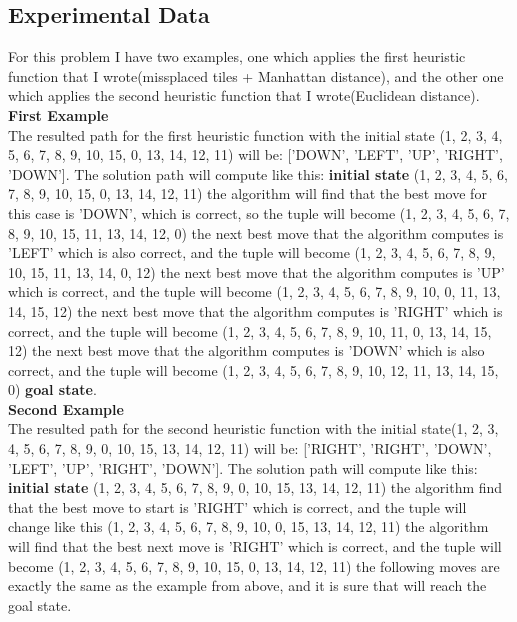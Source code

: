 \documentclass[14pt]{article}
\begin{document}
\subsection{Experimental Data}
For this problem I have two examples, one which applies the first heuristic function that I wrote(missplaced tiles + Manhattan distance), and the other one which applies the second heuristic function that I wrote(Euclidean distance).
\vspace{2.5 mm}
\\\textbf{First Example}
\vspace{2.5 mm}
\\The resulted path for the first heuristic function with the initial state (1, 2, 3, 4, 5, 6, 7, 8, 9, 10, 15, 0, 13, 14, 12, 11) will be: ['DOWN', 'LEFT', 'UP', 'RIGHT', 'DOWN']. The solution path will compute like this: \textbf{initial state} \textrightarrow (1, 2, 3, 4, 5, 6, 7, 8, 9, 10, 15, 0, 13, 14, 12, 11) \textrightarrow the algorithm will find that the best move for this case is 'DOWN', which is correct, so the tuple will become (1, 2, 3, 4, 5, 6, 7, 8, 9, 10, 15, 11, 13, 14, 12, 0) \textrightarrow the next best move that the algorithm computes is 'LEFT' which is also correct, and the tuple will become (1, 2, 3, 4, 5, 6, 7, 8, 9, 10, 15, 11, 13, 14, 0, 12) \textrightarrow the next best move that the algorithm computes is 'UP' which is correct, and the tuple will become (1, 2, 3, 4, 5, 6, 7, 8, 9, 10, 0, 11, 13, 14, 15, 12) \textrightarrow the next best move that the algorithm computes is 'RIGHT' which is correct, and the tuple will become (1, 2, 3, 4, 5, 6, 7, 8, 9, 10, 11, 0, 13, 14, 15, 12) \textrightarrow the next best move that the algorithm computes is 'DOWN' which is also correct, and the tuple will become (1, 2, 3, 4, 5, 6, 7, 8, 9, 10, 12, 11, 13, 14, 15, 0) \textrightarrow \textbf{goal state}.
\vspace{2.5 mm}
\\\textbf{Second Example}
\vspace{2.5 mm}
\\The resulted path for the second heuristic function with the initial state(1, 2, 3, 4, 5, 6, 7, 8, 9, 0, 10, 15, 13, 14, 12, 11) will be: ['RIGHT', 'RIGHT', 'DOWN', 'LEFT', 'UP', 'RIGHT', 'DOWN']. The solution path will compute like this: \textbf{initial state} \textrightarrow (1, 2, 3, 4, 5, 6, 7, 8, 9, 0, 10, 15, 13, 14, 12, 11) \textrightarrow the algorithm find that the best move to start is 'RIGHT' which is correct, and the tuple will change like this (1, 2, 3, 4, 5, 6, 7, 8, 9, 10, 0, 15, 13, 14, 12, 11) \textrightarrow the algorithm will find that the best next move is 'RIGHT' which is correct, and the tuple will become (1, 2, 3, 4, 5, 6, 7, 8, 9, 10, 15, 0, 13, 14, 12, 11) \textrightarrow the following moves are exactly the same as the example from above, and it is sure that will reach the goal state.
\end{document}
